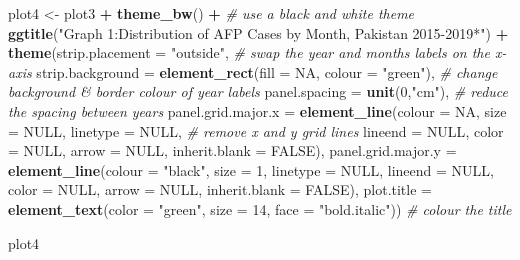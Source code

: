 \documentclass[]{article}
\newenvironment{Shaded}{\begin{snugshade}}{\end{snugshade}}
\newcommand{\CommentTok}[1]{\textcolor[rgb]{0.56,0.35,0.01}{\textit{#1}}}
\newcommand{\DataTypeTok}[1]{\textcolor[rgb]{0.13,0.29,0.53}{#1}}
\newcommand{\DecValTok}[1]{\textcolor[rgb]{0.00,0.00,0.81}{#1}}
\newcommand{\KeywordTok}[1]{\textcolor[rgb]{0.13,0.29,0.53}{\textbf{#1}}}
\newcommand{\NormalTok}[1]{#1}
\newcommand{\OperatorTok}[1]{\textcolor[rgb]{0.81,0.36,0.00}{\textbf{#1}}}
\newcommand{\OtherTok}[1]{\textcolor[rgb]{0.56,0.35,0.01}{#1}}
\newcommand{\StringTok}[1]{\textcolor[rgb]{0.31,0.60,0.02}{#1}}
\begin{document}
\begin{Shaded}
\begin{Highlighting}[]
\NormalTok{plot4 <-}\StringTok{ }
\StringTok{  }\NormalTok{plot3 }\OperatorTok{+}\StringTok{ }
\StringTok{  }\KeywordTok{theme_bw}\NormalTok{() }\OperatorTok{+}\StringTok{                                                                      }\CommentTok{# use a black and white theme}
\StringTok{  }\KeywordTok{ggtitle}\NormalTok{(}\StringTok{"Graph 1:Distribution of AFP Cases by Month, Pakistan 2015-2019*"}\NormalTok{) }\OperatorTok{+}
\StringTok{  }\KeywordTok{theme}\NormalTok{(}\DataTypeTok{strip.placement =} \StringTok{"outside"}\NormalTok{,                                    }\CommentTok{# swap the year and months labels on the x-axis}
        \DataTypeTok{strip.background =} \KeywordTok{element_rect}\NormalTok{(}\DataTypeTok{fill =} \OtherTok{NA}\NormalTok{, }\DataTypeTok{colour =} \StringTok{"green"}\NormalTok{),   }\CommentTok{# change background & border colour of year labels}
        \DataTypeTok{panel.spacing =} \KeywordTok{unit}\NormalTok{(}\DecValTok{0}\NormalTok{,}\StringTok{"cm"}\NormalTok{),                                  }\CommentTok{# reduce the spacing between years}
        \DataTypeTok{panel.grid.major.x =} \KeywordTok{element_line}\NormalTok{(}\DataTypeTok{colour =} \OtherTok{NA}\NormalTok{, }\DataTypeTok{size =} \OtherTok{NULL}\NormalTok{, }\DataTypeTok{linetype =} \OtherTok{NULL}\NormalTok{,  }\CommentTok{# remove x and y grid lines}
                                          \DataTypeTok{lineend =} \OtherTok{NULL}\NormalTok{, }\DataTypeTok{color =} \OtherTok{NULL}\NormalTok{, }\DataTypeTok{arrow =} \OtherTok{NULL}\NormalTok{,}
                                          \DataTypeTok{inherit.blank =} \OtherTok{FALSE}\NormalTok{),}
        \DataTypeTok{panel.grid.major.y =} \KeywordTok{element_line}\NormalTok{(}\DataTypeTok{colour =} \StringTok{"black"}\NormalTok{, }\DataTypeTok{size =} \DecValTok{1}\NormalTok{, }\DataTypeTok{linetype =} \OtherTok{NULL}\NormalTok{,}
                                          \DataTypeTok{lineend =} \OtherTok{NULL}\NormalTok{, }\DataTypeTok{color =} \OtherTok{NULL}\NormalTok{, }\DataTypeTok{arrow =} \OtherTok{NULL}\NormalTok{,}
                                          \DataTypeTok{inherit.blank =} \OtherTok{FALSE}\NormalTok{),}
        \DataTypeTok{plot.title =} \KeywordTok{element_text}\NormalTok{(}\DataTypeTok{color =} \StringTok{"green"}\NormalTok{, }\DataTypeTok{size =} \DecValTok{14}\NormalTok{, }\DataTypeTok{face =} \StringTok{"bold.italic"}\NormalTok{)) }\CommentTok{# colour the title}

\NormalTok{plot4}
\end{Highlighting}
\end{Shaded}
\end{document}
